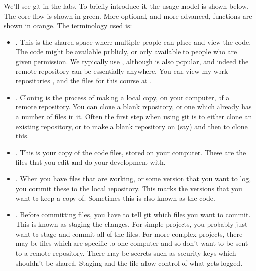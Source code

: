\documentclass[letterpaper,10pt,british]{sphinxmanual}
\begin{document}
\sphinxAtStartPar
We’ll see git in the labs. To briefly introduce it, the usage model is shown below. The core flow is shown in green. More optional, and more advanced, functions are shown in orange. The terminology used is:
\begin{itemize}
\item {} 
\sphinxAtStartPar
{}. This is the shared space where multiple people can place and view the code. The code might be available publicly, or only available to people who are given permission. We typically use , although  is also popular, and indeed the remote repository can be essentially anywhere. You can view my work repositories , and the files for this course at .

\item {} 
\sphinxAtStartPar
{}. Cloning is the process of making a local copy, on your computer, of a remote repository. You can clone a blank repository, or one which already has a number of files in it. Often the first step when using git is to either clone an existing repository, or to make a blank repository on  (say) and then to clone this.

\item {} 
\sphinxAtStartPar
{}. This is your copy of the code files, stored on your computer. These are the files that you edit and do your development with.

\item {} 
\sphinxAtStartPar
{}. When you have files that are working, or some version that you want to log, you commit these to the local repository. This marks the versions that you want to keep a copy of. Sometimes this is also known as  the code.

\item {} 
\sphinxAtStartPar
{}. Before committing files, you have to tell git which files you want to commit. This is known as staging the changes. For simple projects, you probably just want to stage and commit all of the files. For more complex projects, there may be files which are specific to one computer and so don’t want to be sent to a remote repository. There may be secrets such as security keys which shouldn’t be shared. Staging and the  file allow control of what gets logged.


\end{itemize}
\end{document}
